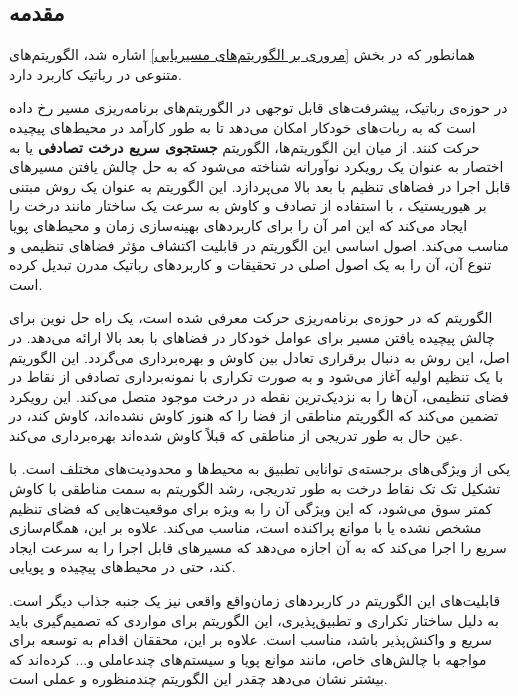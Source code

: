 \subsection{مقدمه}
همانطور که در بخش
\ref{مروری بر الگوریتم‌های مسیریابی}
اشاره شد، الگوریتم‌های متنوعی در رباتیک کاربرد دارد.

در حوزه‌ی رباتیک، پیشرفت‌های قابل توجهی در الگوریتم‌های برنامه‌ریزی مسیر رخ داده است که به ربات‌های خودکار امکان می‌دهد تا به طور کارآمد در محیط‌های پیچیده حرکت کنند. از میان این الگوریتم‌ها، الگوریتم 
\textbf{جستجوی سریع درخت تصادفی}
\noindent\unskip{}
یا به اختصار
به عنوان یک رویکرد نوآورانه شناخته می‌شود که به حل چالش یافتن مسیرهای قابل اجرا در فضاهای تنظیم با بعد بالا می‌پردازد. این الگوریتم به عنوان یک روش مبتنی بر هیوریستیک
\noindent\unskip{}
، با استفاده از تصادف و کاوش به سرعت یک ساختار مانند درخت را ایجاد می‌کند که این امر آن را برای کاربردهای بهینه‌سازی زمان و محیط‌های پویا مناسب می‌کند. اصول اساسی این الگوریتم در قابلیت اکتشاف مؤثر فضاهای تنظیمی و تنوع آن، آن را به یک اصول اصلی در تحقیقات و کاربردهای رباتیک مدرن تبدیل کرده است.

الگوریتم
که در حوزه‌ی برنامه‌ریزی حرکت معرفی شده است، یک راه حل نوین برای چالش پیچیده یافتن مسیر برای عوامل خودکار در فضاهای با بعد بالا ارائه می‌دهد. در اصل، این روش به دنبال برقراری تعادل بین کاوش و بهره‌برداری می‌گردد. این الگوریتم با یک تنظیم اولیه آغاز می‌شود و به صورت تکراری با نمونه‌برداری تصادفی از نقاط در فضای تنظیمی، آن‌ها را به نزدیک‌ترین نقطه در درخت موجود متصل می‌کند. این رویکرد تضمین می‌کند که الگوریتم مناطقی از فضا را که هنوز کاوش نشده‌اند، کاوش کند، در عین حال به طور تدریجی از مناطقی که قبلاً کاوش شده‌اند بهره‌برداری می‌کند.

یکی از ویژگی‌های برجسته‌ی
توانایی تطبیق به محیط‌ها و محدودیت‌های مختلف است. با تشکیل تک تک نقاط درخت به طور تدریجی، رشد الگوریتم به سمت مناطقی با کاوش کمتر سوق می‌شود، که این ویژگی آن را به ویژه برای موقعیت‌هایی که فضای تنظیم مشخص نشده یا با موانع پراکنده است، مناسب می‌کند. علاوه بر این،
همگام‌سازی سریع را اجرا می‌کند که به آن اجازه می‌دهد که مسیرهای قابل اجرا را به سرعت ایجاد کند، حتی در محیط‌های پیچیده و پویایی.

قابلیت‌های این الگوریتم در کاربردهای زمان‌واقع واقعی نیز یک جنبه جذاب دیگر است. به دلیل ساختار تکراری و تطبیق‌پذیری، این الگوریتم برای مواردی که تصمیم‌گیری باید سریع و واکنش‌پذیر باشد، مناسب است. علاوه بر این، محققان اقدام به توسعه
برای مواجهه با چالش‌های خاص، مانند موانع پویا و سیستم‌های چندعاملی و... کرده‌اند که بیشتر نشان می‌دهد چقدر این الگوریتم چندمنظوره و عملی است.

